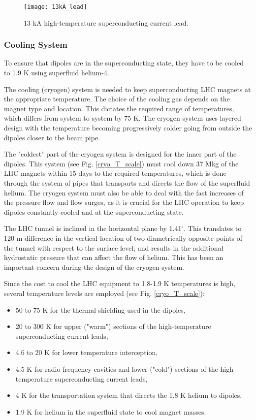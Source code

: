 \begin{normalsize}
\begin{figure}[H]
  \centering
  \texttt{[image: 13kA\_lead]}
  \caption{13 kA high-temperature superconducting current lead.}\label{13kA_lead}
\end{figure}



\subsubsection{Cooling System}\label{sec:cryogenic}

To ensure that dipoles are in the superconducting state, they have to be cooled to 1.9 K using superfluid helium-4. 

The cooling (cryogen) system is needed to keep superconducting LHC magnets at the appropriate temperature. The choice of the cooling gas depends on the magnet type and location. This dictates the required range of temperatures, which differs from system to system by 75 K. The cryogen system uses layered design with the temperature becoming progressively colder going from outside the dipoles closer to the beam pipe. 

The "coldest" part of the cryogen system is designed for the inner part of the dipoles. This system (see Fig. \ref{cryo_T_scale}) must cool down 37 Mkg of the LHC magnets within 15 days to the required temperatures, which is done through the system of pipes that transports and directs the flow of the superfluid helium. The cryogen system must also be able to deal with the fast increases of the pressure flow and flow surges, as it is crucial for the LHC operation to keep dipoles constantly cooled and at the superconducting state.


The LHC tunnel is inclined in the horizontal plane by 1.41$^\circ$. This translates to 120 m difference in the vertical location of two diametrically opposite points of the tunnel with respect to the surface level; and results in the additional hydrostatic pressure that can affect the flow of helium. This has been an important concern during the design of the cryogen system.


Since the cost to cool the LHC equipment to 1.8-1.9 K temperatures is high, several temperature levels are employed (see Fig. \ref{cryo_T_scale}):
 
\begin{itemize}
\item 50 to 75 K for the thermal shielding used in the dipoles,
\item 20 to 300 K for upper ("warm") sections of the high-temperature superconducting current leads,
\item 4.6 to 20 K for lower temperature interception,
\item 4.5 K for radio frequency cavities and lower ("cold") sections of the high-temperature superconducting current leads,
\item 4 K for the transportation system that directs the 1.8 K helium to dipoles,
\item 1.9 K for helium in the superfluid state to cool magnet masses.
\end{itemize}


\end{normalsize}
